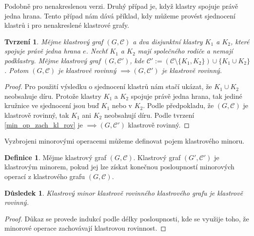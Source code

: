 \documentclass[12pt,a4report]{report}
\newtheorem{tvr}[theorem]{Tvrzení}
\newtheorem{dusl}[theorem]{Důsledek}
\theoremstyle{definition}
\newtheorem{defn}[theorem]{Definice}
\begin{document}
Podobně pro nenakreslenou verzi. Druhý případ je, když klastry spojuje právě jedna hrana. Tento případ nám dává příklad, kdy můžeme provést sjednocení klastrů i pro nenakreslené klastrové grafy.
\begin{tvr}
Mějme klastrový graf  $(G, \mathcal C)$ a dva disjunktní klastry $K_1$ a $K_2$, které spojuje právě jedna hrana $e$. Nechť $K_1$ a $K_2$ mají společného rodiče a nemají podklastry. Mějme klastrový graf $(G, \mathcal C')$, kde  $\mathcal C'  := (\mathcal C \setminus \{K_1,K_2\}) \cup \{K_1 \cup K_2\}$. Potom $(G, \mathcal C)$ je klastrově rovinný $\implies (G, \mathcal C')$ je klastrově rovinný.
\end{tvr}
\begin{proof}
Pro použití výsledku o sjednocení klastrů nám stačí ukázat, že $K_1 \cup K_2$ neobsahuje díru. Protože klastry $K_1$ a $K_2$ spojuje právě jedna hrana, tak jediné kružnice ve sjednocení jsou buď $K_1$ nebo v $K_2$. Podle předpokladu, že $(G, \mathcal C)$ je klastrově rovinný, tak $K_1$ ani $K_2$ neobsahují díru. Podle tvrzení \ref{min_op_zach_kl_rov} je $\implies (G, \mathcal C')$ klastrově rovinný.
\end{proof}

Vyzbrojeni minorovými operacemi můžeme definovat pojem klastrového minoru.

\begin{defn}
Mějme klastrový graf $(G,\mathcal C)$. Klastrový graf $(G',\mathcal C')$ je klastrovým minorem, pokud jej lze získat konečnou posloupností minorových operací z klastrového grafu $(G,\mathcal C)$.
\end{defn}

\begin{dusl} Klastrový minor klastrově rovinného klastrového grafu je klastrově rovinný.
\label{důsledek}
\end{dusl}
\begin{proof}
Důkaz se provede indukcí podle délky posloupnosti, kde se využije toho, že minorové operace zachovávají klastrovou rovinnost.
\end{proof}
\end{document}

